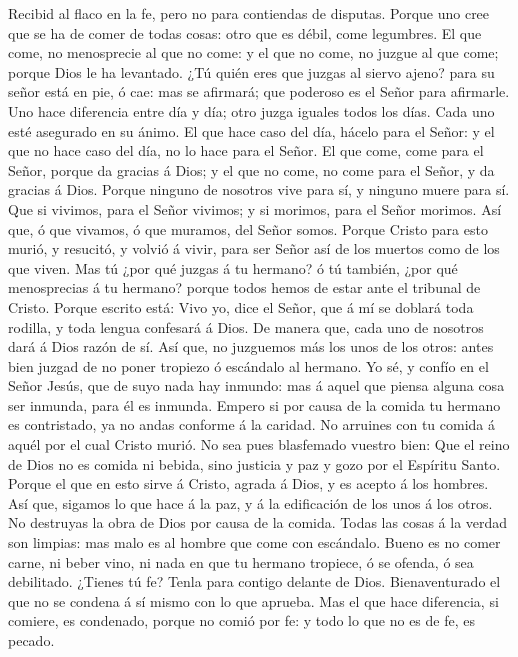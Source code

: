  Recibid al flaco en la fe, pero no para contiendas de
disputas.  Porque uno cree que se ha de comer de todas
cosas: otro que es débil, come legumbres.  El que come, no
menosprecie al que no come: y el que no come, no juzgue al que come;
porque Dios le ha levantado.  ¿Tú quién eres que juzgas al
siervo ajeno? para su señor está en pie, ó cae: mas se afirmará; que
poderoso es el Señor para afirmarle.  Uno hace diferencia
entre día y día; otro juzga iguales todos los días. Cada uno esté
asegurado en su ánimo.  El que hace caso del día, hácelo
para el Señor: y el que no hace caso del día, no lo hace para el Señor.
El que come, come para el Señor, porque da gracias á Dios; y el que no
come, no come para el Señor, y da gracias á Dios.  Porque
ninguno de nosotros vive para sí, y ninguno muere para sí. 
Que si vivimos, para el Señor vivimos; y si morimos, para el Señor
morimos. Así que, ó que vivamos, ó que muramos, del Señor somos.
 Porque Cristo para esto murió, y resucitó, y volvió á
vivir, para ser Señor así de los muertos como de los que viven.
 Mas tú ¿por qué juzgas á tu hermano? ó tú también, ¿por
qué menosprecias á tu hermano? porque todos hemos de estar ante el
tribunal de Cristo.  Porque escrito está: Vivo yo, dice el
Señor, que á mí se doblará toda rodilla, y toda lengua confesará á Dios.
 De manera que, cada uno de nosotros dará á Dios razón de
sí.  Así que, no juzguemos más los unos de los otros: antes
bien juzgad de no poner tropiezo ó escándalo al hermano. 
Yo sé, y confío en el Señor Jesús, que de suyo nada hay inmundo: mas á
aquel que piensa alguna cosa ser inmunda, para él es inmunda.
 Empero si por causa de la comida tu hermano es
contristado, ya no andas conforme á la caridad. No arruines con tu
comida á aquél por el cual Cristo murió.  No sea pues
blasfemado vuestro bien:  Que el reino de Dios no es comida
ni bebida, sino justicia y paz y gozo por el Espíritu Santo.
 Porque el que en esto sirve á Cristo, agrada á Dios, y es
acepto á los hombres.  Así que, sigamos lo que hace á la
paz, y á la edificación de los unos á los otros.  No
destruyas la obra de Dios por causa de la comida. Todas las cosas á la
verdad son limpias: mas malo es al hombre que come con escándalo.
 Bueno es no comer carne, ni beber vino, ni nada en que tu
hermano tropiece, ó se ofenda, ó sea debilitado.  ¿Tienes
tú fe? Tenla para contigo delante de Dios. Bienaventurado el que no se
condena á sí mismo con lo que aprueba.  Mas el que hace
diferencia, si comiere, es condenado, porque no comió por fe: y todo lo
que no es de fe, es pecado.


